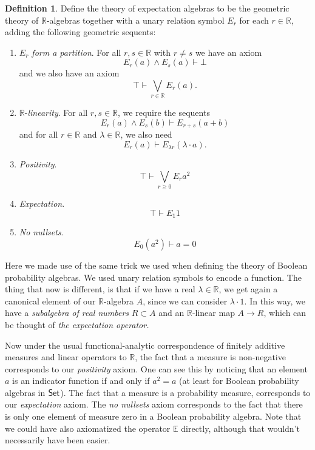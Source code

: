 \documentclass[a4paper]{amsproc}
\theoremstyle{plain}
\theoremstyle{definition}
\newtheorem{definition}[theorem]{Definition}
\theoremstyle{remark}
\numberwithin{equation}{section}
\newcommand{\Set}{\textup{\textsf{Set}}}
\begin{document}
\begin{definition}
    Define the theory of expectation algebras to be the geometric theory of $\mathbb{R}$-algebras together with a unary relation symbol $E_r$ for each $r \in \mathbb{R}$, adding the following geometric sequents:
    \begin{enumerate}
        \item \textit{$E_r$ form a partition}. For all $r, s \in \mathbb{R}$ with $r \neq s$ we have an axiom
        \[
        E_r(a)  \wedge E_s(a) \vdash \bot
        \]
        and we also have an axiom
        \[
        \top \vdash \bigvee_{r \in \mathbb{R}} E_r(a).
        \]
        \item $\mathbb{R}$-\textit{linearity}. For all $r, s \in \mathbb{R}$, we require the sequents
        \[
        E_r(a) \wedge E_s(b) \vdash E_{r+s}(a + b)
        \]
        and for all $r \in \mathbb{R}$ and $\lambda \in \mathbb{R}$, we also need
        \[
        E_r(a) \vdash E_{\lambda r} (\lambda \cdot a) .
        \]
        \item \textit{Positivity}.
        \[
            \top \vdash \bigvee_{r \geq 0} E_r a^2
        \]
        \item \textit{Expectation}.
        \[
            \top \vdash E_1 1
        \]
        \item \textit{No nullsets}.
        \[
            E_0 (a^2) \vdash a = 0 %
        \]
    \end{enumerate}
\end{definition}

Here we made use of the same trick we used when defining the theory of Boolean probability algebras. We used unary relation symbols to encode a function. The thing that now is different, is that if we have a real $\lambda \in \mathbb{R}$, we get again a canonical element of our $\mathbb{R}$-algebra $A$, since we can consider $\lambda \cdot 1$. In this way, we have a \emph{subalgebra of real numbers} $R \subset A$ and an $\mathbb{R}$-linear map $A \to R$, which can be thought of \emph{the expectation operator.}

Now under the usual functional-analytic correspondence of finitely additive measures and linear operators to $\mathbb{R}$, the fact that a measure is non-negative corresponds to our \emph{positivity} axiom. One can see this by noticing that an element $a$ is an indicator function if and only if $a^2 = a$ (at least for Boolean probability algebras in $\Set$). The fact that a measure is a probability measure, corresponds to our \emph{expectation} axiom. The \emph{no nullsets} axiom corresponds to the fact that there is only one element of measure zero in a Boolean probability algebra. Note that we could have also axiomatized the operator $\mathbb{E}$ directly, although that wouldn't necessarily have been easier.
\end{document}
